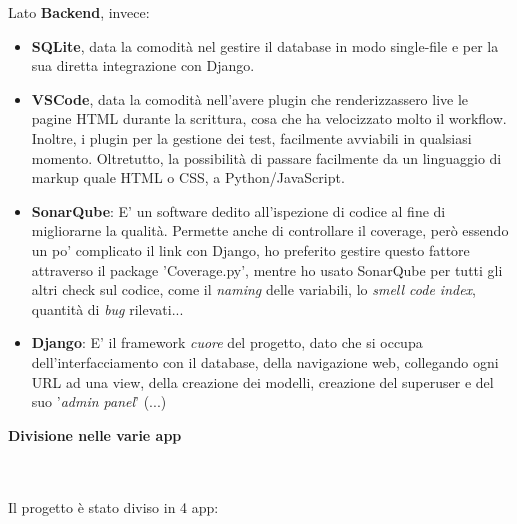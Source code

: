 \documentclass[12pt]{article}
\begin{document}
	\noindent Lato \textbf{Backend}, invece: 
	\begin{itemize}
		\item \textbf{SQLite}, data la comodità nel gestire il database in modo single-file e per la sua diretta integrazione con Django. \\
		
		\item \textbf{VSCode}, data la comodità nell'avere plugin che renderizzassero live le pagine HTML durante la scrittura, cosa che ha velocizzato molto il workflow. Inoltre, i plugin per la gestione dei test, facilmente avviabili in qualsiasi momento. Oltretutto, la possibilità di passare facilmente da un linguaggio di markup quale HTML o CSS, a Python/JavaScript. \\
		
		\item \textbf{SonarQube}: E' un software dedito all'ispezione di codice al fine di migliorarne la qualità. Permette anche di controllare il coverage, però essendo un po' complicato il link con Django, ho preferito gestire questo fattore attraverso il package 'Coverage.py', mentre ho usato SonarQube per tutti gli altri check sul codice, come il \textit{naming} delle variabili, lo \textit{smell code index}, quantità di \textit{bug} rilevati...
		
		\item \textbf{Django}: E' il framework \textit{cuore} del progetto, dato che si occupa dell'interfacciamento con il database, della navigazione web, collegando ogni URL ad una view, della creazione dei modelli, creazione del superuser e del suo '\textit{admin panel}' (...)
	\end{itemize}
	\pagebreak

	
	\noindent \centerline {\Huge \textbf{Divisione nelle varie app}} \\ \\ 
	Il progetto è stato diviso in 4 app:
	
\end{document}
